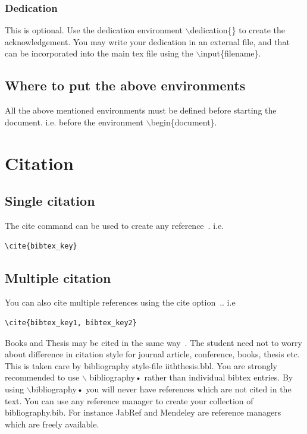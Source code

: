 \documentclass[a4paper,twoside]{iiththesis}
\begin{document}
\subsection{Dedication}
This is optional. Use the dedication environment $ \backslash $dedication\{\}   to create the acknowledgement.
You may write your dedication in an external file, and that can be incorporated into the main tex file using the $ \backslash $input\{filename\}.

\section{Where to put the above environments}
All the above mentioned environments must be defined before starting the document. i.e. before the environment
 $ \backslash $begin\{document\}.

\chapter{Citation}
\section{Single citation}
The cite command can be used to create any reference~\cite{Achenbach1995}. i.e. 
\begin{verbatim}
\cite{bibtex_key}
\end{verbatim}


\section{Multiple citation}
You can also cite multiple references using the cite option~\cite{Achenbach1995,Aguiar2004}.. i.e
\begin{verbatim}
\cite{bibtex_key1, bibtex_key2}
\end{verbatim}

Books and Thesis may be cited in the same way~\cite{Bard2001,Iordanidis2002}. The student need not to worry about difference in citation style for journal article, conference, books, thesis etc. This is taken care by bibliography style-file iiththesis.bbl. You are strongly recommended to use $ \backslash $ bibliography{•} rather than individual bibtex entries. By using $ \backslash $bibliography{•} you will never have references which are not cited in the text. You can use any reference manager to create your collection of bibliography.bib. For instance JabRef and Mendeley are reference managers which are freely available.
\end{document}
